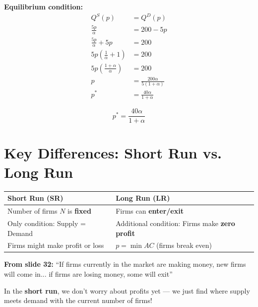\documentclass[11pt]{article}
\begin{document}
\textbf{Equilibrium condition:}
\begin{align*}
Q^S(p) &= Q^D(p) \\
\frac{5p}{\alpha} &= 200 - 5p \\
\frac{5p}{\alpha} + 5p &= 200 \\
5p\left(\frac{1}{\alpha} + 1\right) &= 200 \\
5p\left(\frac{1 + \alpha}{\alpha}\right) &= 200 \\
p &= \frac{200\alpha}{5(1 + \alpha)} \\
p^* &= \frac{40\alpha}{1 + \alpha}
\end{align*}

\begin{tcolorbox}[colback=yellow!10, colframe=orange!75!black, title=Final Answer:]
\Large
\[
\boxed{p^* = \frac{40\alpha}{1 + \alpha}}
\]
\end{tcolorbox}

\newpage

\section{Key Differences: Short Run vs. Long Run}

\begin{center}
\begin{tabular}{p{6cm}|p{6cm}}
\toprule
\textbf{Short Run (SR)} & \textbf{Long Run (LR)} \\
\midrule
Number of firms $N$ is \textbf{fixed} & Firms can \textbf{enter/exit} \\
\addlinespace
Only condition: Supply = Demand & Additional condition: Firms make \textbf{zero profit} \\
\addlinespace
Firms might make profit or loss & $p = \min AC$ (firms break even) \\
\bottomrule
\end{tabular}
\end{center}

\vspace{0.5cm}

\begin{tcolorbox}[colback=boxblue, colframe=blue!50!black]
\textbf{From slide 32:} ``If firms currently in the market are making money, new firms will come in... if firms are losing money, some will exit''
\end{tcolorbox}

\vspace{0.3cm}

In the \textbf{short run}, we don't worry about profits yet --- we just find where supply meets demand with the current number of firms!
\end{document}
